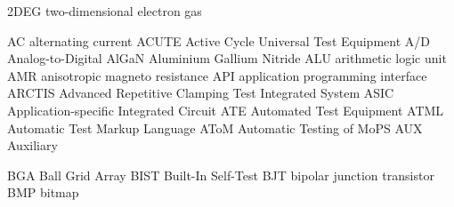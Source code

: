 
		{2DEG}		{two-dimensional electron gas}

			{AC}		{alternating current}
		{ACUTE}		{Active Cycle Universal Test Equipment}
			{A/D}		{Analog-to-Digital}
		{AlGaN}		{Aluminium Gallium Nitride}
		{ALU}		{arithmetic logic unit}
		{AMR}		{anisotropic magneto resistance}
		{API}		{application programming interface}
		{ARCTIS}	{Advanced Repetitive Clamping Test Integrated System}
		{ASIC}		{Application-specific Integrated Circuit}
		{ATE}		{Automated Test Equipment}
		{ATML}		{Automatic Test Markup Language}
		{AToM}		{Automatic Testing of MoPS}
		{AUX}		{Auxiliary}

		{BGA}		{Ball Grid Array}
		{BIST}		{Built-In Self-Test}
		{BJT}		{bipolar junction transistor}
		{BMP}		{bitmap}

